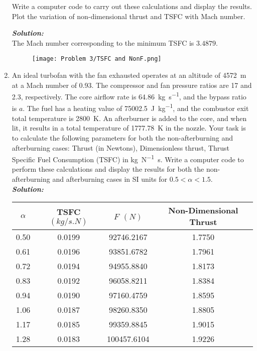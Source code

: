 \documentclass[]{article}
\theoremstyle{definition}
\begin{document}
\begin{enumerate}
Write a computer code to carry out these calculations and display the results. Plot the variation of non-dimensional thrust and TSFC with Mach number.

\emph{\textbf{Solution:}}
\\
The Mach number corresponding to the minimum TSFC is $3.4879$.
\begin{figure}[h]
\texttt{[image: Problem 3/TSFC and NonF.png]}
\centering
\end{figure}

\newpage
\item 
An ideal turbofan with the fan exhausted operates at an altitude of \SI{4572}{\meter} at
a Mach number of 0.93. The compressor and fan pressure ratios are 17 and 2.3,
respectively. The core airflow rate is \SI{64.86}{\kilogram\per\second}, and the bypass ratio is $a$. The
fuel has a heating value of \SI{75002.5}{\joule\per\kilogram}, and the combustor exit total temperature
is \SI{2800}{\kelvin}. An afterburner is added to the core, and when lit, it results in a total
temperature of \SI{1777.78}{\kelvin} in the nozzle.
Your task is to calculate the following parameters for both the non-afterburning and afterburning cases:
Thrust (in Newtons), Dimensionless thrust, Thrust Specific Fuel Consumption (TSFC) in \si{\kilogram\per\newton\second}. Write a computer code to perform these calculations and display the results for both the non-afterburning and afterburning cases in SI units for $0.5 < \alpha < 1.5$.\\
\emph{\textbf{Solution:}}
\begin{table}[htpb]
\centering
\begin{subtable}{0.5\textwidth}
\begin{tabular}{| c | c | c | c |}
\hline
$\alpha$ & TSFC $(kg/s.N)$ & $F$ $(N)$ & Non-Dimensional Thrust \\
\hline
0.50 & 0.0199 & 92746.2167 & 1.7750 \\
\hline
0.61 & 0.0196 & 93851.6782 & 1.7961 \\
\hline
0.72 & 0.0194 & 94955.8840 & 1.8173 \\
\hline
0.83 & 0.0192 & 96058.8211 & 1.8384 \\
\hline
0.94 & 0.0190 & 97160.4759 & 1.8595 \\
\hline
1.06 & 0.0187 & 98260.8350 & 1.8805 \\
\hline
1.17 & 0.0185 & 99359.8845 & 1.9015 \\
\hline
1.28 & 0.0183 & 100457.6104 & 1.9226 \\

\end{tabular}
\end{subtable}
\end{table}
\end{enumerate}
\end{document}
